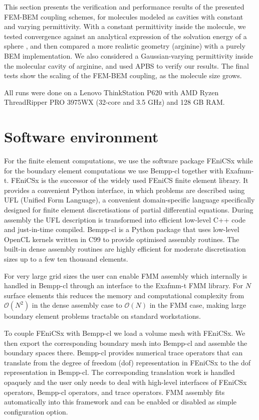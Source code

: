 This section presents the verification and performance results of the presented FEM-BEM coupling schemes, for molecules modeled as cavities with constant and varying permittivity.
With a constant permittivity inside the molecule, we tested convergence against an analytical expression of the solvation energy of a sphere \cite{Kirkwood1934}, and then compared a more realistic geometry (arginine) with a purely BEM implementation.
We also considered a Gaussian-varying permittivity\cite{grant2001smooth,li2013dielectric} inside the molecular cavity of arginine, and used APBS \cite{BakerETal2001} to verify our results.
The final tests show the scaling of the FEM-BEM coupling, as the molecule size grows. 

All runs were done on a Lenovo ThinkStation P620 with AMD Ryzen ThreadRipper PRO 3975WX (32-core and 3.5 GHz) and 128 GB RAM. 

\section*{\sffamily \Large Software environment}

For the finite element computations, we use the software package FEniCSx while for the boundary element computations we use Bempp-cl together with Exafmm-t. FEniCSx is the successor of the widely used FEniCS finite element library.
It provides a convenient Python interface, in which problems are described using UFL (Unified Form Language), a convenient domain-specific language specifically designed for finite element discretisations of partial differential equations. During assembly the UFL description is transformed into efficient low-level C++ code and just-in-time compiled. Bempp-cl is a Python package that uses low-level OpenCL kernels written in C99 to provide optimised assembly routines. The built-in dense assembly routines are highly efficient for moderate discretisation sizes up to a few ten thousand elements.

For very large grid sizes the user can enable FMM assembly which internally is handled in Bempp-cl through an interface to the Exafmm-t FMM library. For $N$ surface elements this reduces the memory and computational complexity from $\mathcal{O}(N^2)$ in the dense assembly case to $\mathcal{O}(N)$ in the FMM case, making large boundary element problems tractable on standard workstations.

To couple FEniCSx with Bempp-cl we load a volume mesh with FEniCSx. We then export the corresponding boundary mesh into Bempp-cl and assemble the boundary spaces there. Bempp-cl provides numerical trace operators that can translate from the degree of freedom (dof) representation in FEniCSx to the dof representation in Bempp-cl. The corresponding translation work is handled opaquely and the user only needs to deal with high-level interfaces of FEniCSx operators, Bempp-cl operators, and trace operators. FMM assembly fits automatically into this framework and can be enabled or disabled as simple configuration option.

